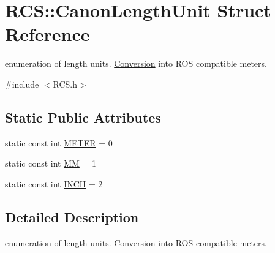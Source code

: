 \hypertarget{structRCS_1_1CanonLengthUnit}{\section{R\-C\-S\-:\-:Canon\-Length\-Unit Struct Reference}
\label{structRCS_1_1CanonLengthUnit}
}


enumeration of length units. \hyperlink{namespaceConversion}{Conversion} into R\-O\-S compatible meters.  




{\ttfamily \#include $<$R\-C\-S.\-h$>$}

\subsection*{Static Public Attributes}
\begin{DoxyCompactItemize}
\item 
static const int \hyperlink{structRCS_1_1CanonLengthUnit_aa0223882057177e61d21fffb0153577d}{M\-E\-T\-E\-R} = 0
\item 
static const int \hyperlink{structRCS_1_1CanonLengthUnit_ad47d86e234efe90b2f4067d706c75294}{M\-M} = 1
\item 
static const int \hyperlink{structRCS_1_1CanonLengthUnit_af8429e8f694f1ece8892964002e125a7}{I\-N\-C\-H} = 2
\end{DoxyCompactItemize}


\subsection{Detailed Description}
enumeration of length units. \hyperlink{namespaceConversion}{Conversion} into R\-O\-S compatible meters. 

